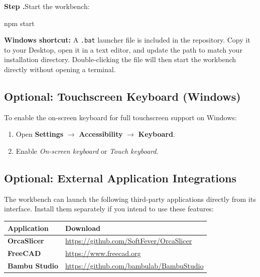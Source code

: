 \documentclass[a4paper,12pt]{article}
\newcounter{stepctr}
\newcommand{\step}[1]{%
    \stepcounter{stepctr}%
    \vspace{4pt}%
    \noindent\textcolor{htlblue}{\textbf{Step \thestepctr.}}\quad #1\par
}
\begin{document}
\newpage
\step{Start the workbench:}
\begin{tcolorbox}[colback=black!90, coltext=green!70!white, fontupper=\ttfamily\small]
npm start
\end{tcolorbox}
 
\begin{notebox}
\textbf{Windows shortcut:} A \texttt{.bat} launcher file is included in the repository. Copy it to your Desktop, open it in a text editor, and update the path to match your installation directory. Double-clicking the file will then start the workbench directly without opening a terminal.
\end{notebox}
 
\subsection{Optional: Touchscreen Keyboard (Windows)}
 
To enable the on-screen keyboard for full touchscreen support on Windows:
 
\begin{enumerate}[leftmargin=1.5em]
    \item Open \textbf{Settings} $\to$ \textbf{Accessibility} $\to$ \textbf{Keyboard}.
    \item Enable \textit{On-screen keyboard} or \textit{Touch keyboard}.
\end{enumerate}
 
\subsection{Optional: External Application Integrations}
 
The workbench can launch the following third-party applications directly from its interface. Install them separately if you intend to use these features:
 
\begin{center}
\begin{tabular}{>{\bfseries}p{3.5cm} p{9.5cm}}
\toprule
Application & Download \\
\midrule
OrcaSlicer  & \url{https://github.com/SoftFever/OrcaSlicer} \\
FreeCAD     & \url{https://www.freecad.org} \\
Bambu Studio & \url{https://github.com/bambulab/BambuStudio} \\
\bottomrule
\end{tabular}
\end{center}
 
\end{document}
